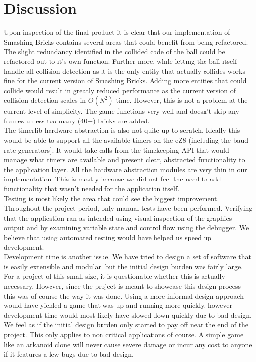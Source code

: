 \section{Discussion}
Upon inspection of the final product it is clear that our implementation of
Smashing Bricks contains several areas that could benefit from being refactored.
The slight redundancy identified in the collided code of the ball could be 
refactored out to it's own function. Further more, while letting the ball
itself handle all collision detection as it is the only entity that actually collides
works fine for the current version of Smashing Bricks. Adding more entities
that could collide would result in greatly reduced performance as the current
version of collision detection scales in \(O(N^2)\) time. However, this is
not a problem at the current level of simplicity. The game functions very well
and doesn't skip any frames unless too many (40+) bricks are added. \\

The timerlib hardware abstraction is also not quite up to scratch. Ideally this would
be able to support all the available timers on the eZ8 (including the baud rate 
generators). It would take calls from the timekeeping API that would manage
what timers are available and present clear, abstracted functionality to the 
application layer. All the hardware abstraction modules are very thin in our
implementation. This is mostly because we did not feel the need to add functionality
that wasn't needed for the application itself. \\

Testing is most likely the area that could see the biggest improvement. Throughout 
the project period, only manual tests have been performed. Verifying that the 
application ran as intended using visual inspection of the graphics output and
by examining variable state and control flow using the debugger. We believe that
using automated testing would have helped us speed up development. \\

Development time is another issue. We have tried to design a set of software that
is easily extensible and modular, but the initial design burden was fairly large.
For a project of this small size, it is questionable whether this is actually 
necessary. However, since the project is meant to showcase this design process
this was of course the way it was done. Using a more informal design approach
would have yielded a game that was up and running more quickly, however development
time would most likely have slowed down quickly due to bad design. We feel as if
the initial design burden only started to pay off near the end of the project.
This only applies to non critical applications of course. A simple game like
an arkanoid clone will never cause severe damage or incur any cost to anyone
if it features a few bugs due to bad design. 
